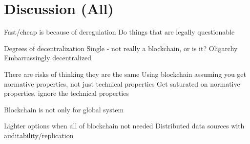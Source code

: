 
\section{Discussion (All)}

Fast/cheap is because of deregulation
	Do things that are legally questionable

Degrees of decentralization
	Single - not really a blockchain, or is it?
	Oligarchy
	Embarrassingly decentralized
	
There are risks of thinking they are the same
	Using blockchain assuming you get normative properties, not just technical properties
	Get saturated on normative properties, ignore the technical properties
	
Blockchain is not only for global system

Lighter options when all of blockchain not needed
	Distributed data sources with auditability/replication
	